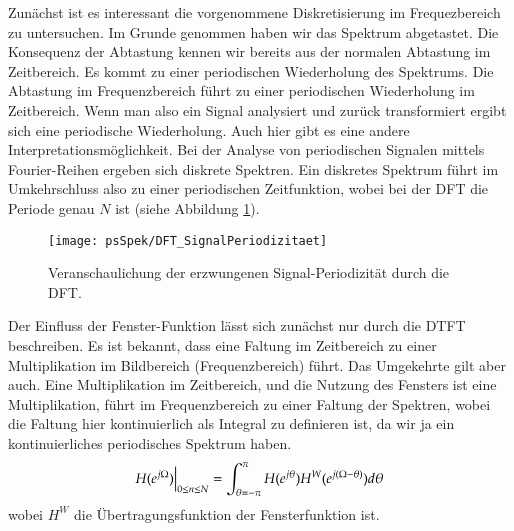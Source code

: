 Zunächst ist es interessant die vorgenommene Diskretisierung im
Frequezbereich zu untersuchen. Im Grunde genommen haben wir das
Spektrum abgetastet. Die Konsequenz der Abtastung kennen wir
bereits aus der normalen Abtastung im Zeitbereich. Es kommt zu
einer periodischen Wiederholung des Spektrums. Die Abtastung im
Frequenzbereich führt zu einer periodischen Wiederholung im
Zeitbereich. Wenn man also ein Signal analysiert und zurück
transformiert ergibt sich eine periodische Wiederholung. Auch hier
gibt es eine andere Interpretationsmöglichkeit. Bei der
Analyse von periodischen Signalen mittels Fourier-Reihen ergeben
sich diskrete Spektren. Ein diskretes Spektrum führt im
Umkehrschluss also zu einer periodischen Zeitfunktion, wobei bei
der DFT die Periode genau $N$ ist (siehe Abbildung
\ref{pic:DFT_SignalPeriode}).

\begin{figure}[H]
\begin{center}
\texttt{[image: psSpek/DFT\_SignalPeriodizitaet]}
\caption{\label{pic:DFT_SignalPeriode}Veranschaulichung der
erzwungenen Signal-Periodizität durch die DFT.}
\end{center}
\end{figure}

Der Einfluss der Fenster-Funktion lässt sich zunächst nur durch
die DTFT beschreiben. Es ist bekannt, dass eine Faltung im
Zeitbereich zu einer Multiplikation im Bildbereich
(Frequenzbereich) führt. Das Umgekehrte gilt aber auch. Eine
Multiplikation im Zeitbereich, und die Nutzung des Fensters ist
eine Multiplikation, führt im Frequenzbereich zu einer Faltung der
Spektren, wobei die Faltung hier kontinuierlich als Integral zu
definieren ist, da wir ja ein kontinuierliches periodisches
Spektrum haben.
\begin{equation} \label{eq:SpektrumBegrenzterFolgen}
    H (e^{j\Omega}) \Big|_{0 \leq n \leq N} = \int_{\theta = -\pi}^{\pi} H
    (e^{j\theta}) H^{W}(e^{j(\Omega - \theta)})d\theta
\end{equation}
wobei $H^{W}$ die Übertragungsfunktion der Fensterfunktion ist.

